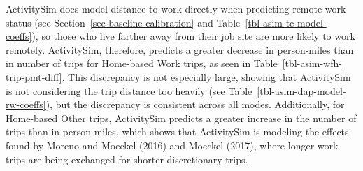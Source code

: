 \documentclass[fancy, twoside, mastersfancy, ms]{byuthesis}
\begin{document}
ActivitySim does model distance to work directly when predicting remote
work status (see Section~\ref{sec-baseline-calibration} and
Table~\ref{tbl-asim-tc-model-coeffs}), so those who live farther away
from their job site are more likely to work remotely. ActivitySim,
therefore, predicts a greater decrease in person-miles than in number of
trips for Home-based Work trips, as seen in
Table~\ref{tbl-asim-wfh-trip-pmt-diff}. This discrepancy is not
especially large, showing that ActivitySim is not considering the trip
distance too heavily (see Table~\ref{tbl-asim-dap-model-rw-coeffs}), but
the discrepancy is consistent across all modes. Additionally, for
Home-based Other trips, ActivitySim predicts a greater increase in the
number of trips than in person-miles, which shows that ActivitySim is
modeling the effects found by Moreno and Moeckel (2016) and Moeckel
(2017), where longer work trips are being exchanged for shorter
discretionary trips.
\end{document}
